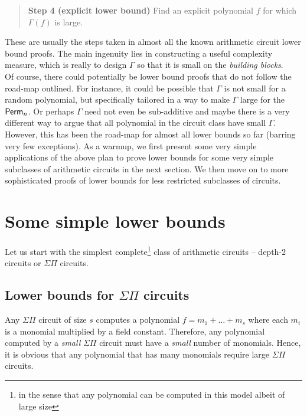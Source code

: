 \documentclass[12pt]{report}
\begin{document}
\begin{quote}
{\bf Step 4 (explicit lower bound)} Find an explicit polynomial $f$ for which $\Gamma(f)$ is large. 
\end{quote} 



These are usually the steps taken in almost all the known arithmetic circuit lower bound proofs. The main ingenuity lies in constructing a useful complexity measure, which is really to design $\Gamma$ so that it is small on the \emph{building blocks}. \\

Of course, there could potentially be lower bound proofs that do not follow the road-map outlined. For instance, it could be possible that $\Gamma$ is not small for a random polynomial, but specifically tailored in a way to make $\Gamma$ large for the $\mathsf{Perm}_n$. Or perhaps $\Gamma$ need not even be sub-additive and maybe there is a very different way to argue that all polynomial in the circuit class have small $\Gamma$. However, this has been the road-map for almost all lower bounds so far (barring very few exceptions). As a warmup, we first present some very simple applications of the above plan to prove lower bounds for some very simple subclasses of arithmetic circuits in the next section. We then move on to more sophisticated proofs of lower bounds for less restricted subclasses of circuits. 

\section{Some simple lower bounds}

Let us start with the simplest complete\footnote{in the sense that any polynomial can be computed in this model albeit of large size}  class of arithmetic circuits -- depth-$2$ circuits or $\Sigma\Pi$ circuits. 

\subsection{Lower bounds for $\Sigma\Pi$ circuits}

Any $\Sigma\Pi$ circuit of size $s$ computes a polynomial $f = m_1 + \dots + m_s$ where each $m_i$ is a monomial multiplied by a field constant. Therefore, any polynomial computed by a \emph{small} $\Sigma\Pi$ circuit must have a \emph{small} number of monomials. Hence, it is obvious that any polynomial that has many monomials require large $\Sigma\Pi$ circuits. 
\end{document}
